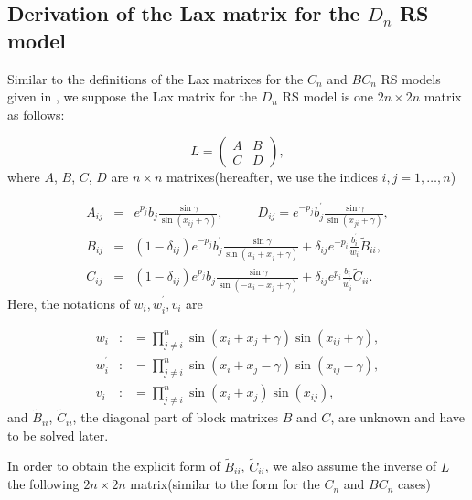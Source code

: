 \documentclass[a4paper,12pt]{article}
\begin{document}
\subsection{Derivation of the Lax matrix for the $D_{n}$ RS model}

Similar to the definitions of the Lax matrixes for the $C_{n}$ and $BC_{n}$
RS models given in \cite{Che00}, we suppose the Lax matrix for the $D_{n}$
RS model is one  $2n\times 2n$ matrix as follows:

\begin{equation}
L=\left(
\begin{array}{ll}
A & B \\
C & D
\end{array}
\right) ,  \label{lmat}
\end{equation}
where $A$, $B$, $C$, $D$ are $n\times n$ matrixes(hereafter, we use the
indices $i,j=1,\ldots ,n$)

\begin{eqnarray}
A_{ij} &=&e^{p_{j}}b_{j}\frac{\sin \gamma }{\sin (x_{ij}+\gamma )},\ \ \ \ \
\ \ \ \ \ \ \ D_{ij}=e^{-p_{j}}b_{j}^{^{\prime }}\frac{\sin \gamma }{\sin
(x_{ji}+\gamma )},  \nonumber \\
B_{ij} &=&(1-\delta _{ij})e^{-p_{j}}b_{j}^{^{\prime }}\frac{\sin \gamma }{
\sin (x_{i}+x_{j}+\gamma )}+\delta _{ij}e^{-p_{i}}\frac{b_{i}^{^{\prime }}}{
w_{i}}\widetilde{B}_{ii},  \nonumber \\
C_{ij} &=&(1-\delta _{ij})e^{p_{j}}b_{j}\frac{\sin \gamma }{\sin
(-x_{i}-x_{j}+\gamma )}+\delta _{ij}e^{p_{i}}\frac{b_{i}}{w_{i}^{^{\prime }}}
\widetilde{C}_{ii}.  \label{l1}
\end{eqnarray}
Here, the notations of $w_{i},w_{i}^{^{\prime }},v_{i}$ are

\begin{eqnarray}
w_{i} &:&=\prod_{j\neq i}^{n}\sin (x_{i}+x_{j}+\gamma )\sin (x_{ij}+\gamma ),
\nonumber \\
w_{i}^{^{\prime }} &:&=\prod_{j\neq i}^{n}\sin (x_{i}+x_{j}-\gamma )\sin
(x_{ij}-\gamma ),  \nonumber \\
v_{i} &:&=\prod_{j\neq i}^{n}\sin (x_{i}+x_{j})\sin (x_{ij}),
\end{eqnarray}
and $\widetilde{B}_{ii}$, $\widetilde{C}_{ii}$, the diagonal part of block
matrixes $B$ and $C$, are unknown and have to be solved later.

In order to obtain the explicit form of $\widetilde{B}_{ii}$, $\widetilde{C }
_{ii}$, we also assume the inverse of $L$ the following $2n\times 2n$
matrix(similar to the form for the $C_{n}$ and $BC_{n}$ cases)
\end{document}

